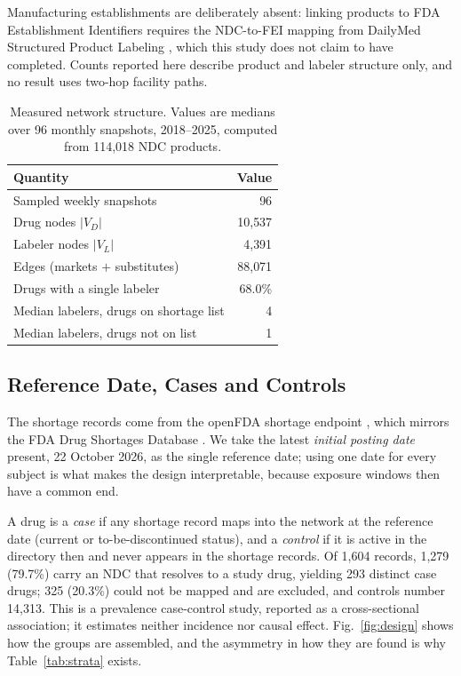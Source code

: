 \documentclass[conference,letterpaper]{IEEEtran}
\begin{document}
Manufacturing establishments are deliberately absent: linking products to FDA
Establishment Identifiers requires the NDC-to-FEI mapping from DailyMed
Structured Product Labeling \cite{dailymed}, which this study does not claim to
have completed. Counts reported here describe product and labeler structure
only, and no result uses two-hop facility paths.

\begin{table}[t]
\caption{Measured network structure. Values are medians over 96 monthly
snapshots, 2018--2025, computed from 114{,}018 NDC products.}
\label{tab:network}
\centering
\footnotesize
\begin{tabular}{@{}lr@{}}
\hline
Quantity & Value\\
\hline
Sampled weekly snapshots & 96\\
Drug nodes $|V_D|$ & 10{,}537\\
Labeler nodes $|V_L|$ & 4{,}391\\
Edges (markets $+$ substitutes) & 88{,}071\\
Drugs with a single labeler & 68.0\%\\
Median labelers, drugs on shortage list & 4\\
Median labelers, drugs not on list & 1\\
\hline
\end{tabular}
\end{table}

\subsection{Reference Date, Cases and Controls}
The shortage records come from the openFDA shortage endpoint \cite{openfda},
which mirrors the FDA Drug Shortages Database \cite{fdads}. We take the latest
\emph{initial posting date} present, 22 October 2026, as the single reference
date; using one date for every subject is what makes the design interpretable,
because exposure windows then have a common end.

A drug is a \emph{case} if any shortage record maps into the network at the
reference date (current or to-be-discontinued status), and a \emph{control} if
it is active in the directory then and never appears in the shortage records. Of
1{,}604 records, 1{,}279 (79.7\%) carry an NDC that resolves to a study drug,
yielding 293 distinct case drugs; 325 (20.3\%) could not be mapped and are
excluded, and controls number 14{,}313. This is a prevalence case-control study,
reported as a cross-sectional association; it estimates neither incidence nor
causal effect. Fig.~\ref{fig:design} shows how the groups are assembled, and the
asymmetry in how they are found is why Table~\ref{tab:strata} exists.
\end{document}
